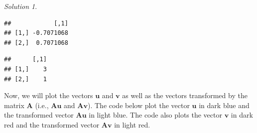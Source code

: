 \documentclass[
]{book}
\newenvironment{Shaded}{\begin{snugshade}}{\end{snugshade}}
\newcommand{\CommentTok}[1]{\textcolor[rgb]{0.56,0.35,0.01}{\textit{#1}}}
\newcommand{\NormalTok}[1]{#1}
\newcommand{\OperatorTok}[1]{\textcolor[rgb]{0.81,0.36,0.00}{\textbf{#1}}}
\newcommand{\StringTok}[1]{\textcolor[rgb]{0.31,0.60,0.02}{#1}}
\theoremstyle{definition}
\theoremstyle{definition}
\theoremstyle{definition}
\theoremstyle{definition}
\theoremstyle{remark}
\newtheorem*{solution}{Solution}
\begin{document}
\begin{solution}
\begin{Shaded}
\end{Shaded}

\begin{verbatim}
##            [,1]
## [1,] -0.7071068
## [2,]  0.7071068
\end{verbatim}

\begin{Shaded}
\end{Shaded}

\begin{verbatim}
##      [,1]
## [1,]    3
## [2,]    1
\end{verbatim}

\begin{Shaded}
\end{Shaded}

Now, we will plot the vectors \(\mathbf{u}\) and \(\mathbf{v}\) as well as the vectors transformed by the matrix \(\mathbf{A}\) (i.e., \(\mathbf{A} \mathbf{u}\) and \(\mathbf{A} \mathbf{v}\)). The code below plot the vector \(\mathbf{u}\) in dark blue and the transformed vector \(\mathbf{A} \mathbf{u}\) in light blue. The code also plots the vector \(\mathbf{v}\) in dark red and the transformed vector \(\mathbf{A} \mathbf{v}\) in light red.


\end{solution}
\end{document}
